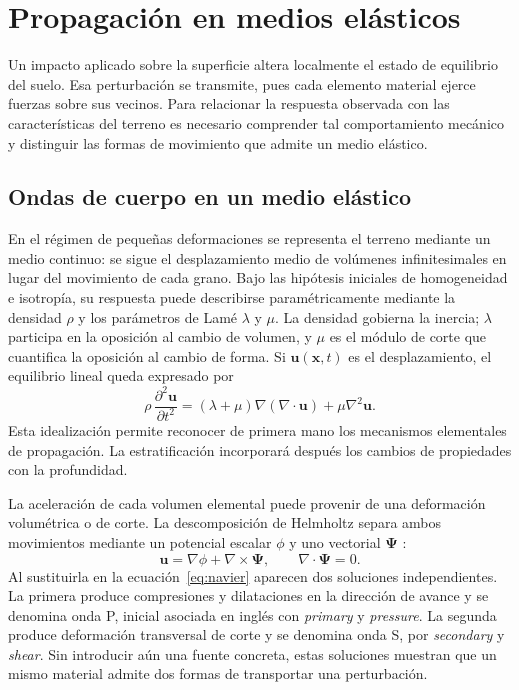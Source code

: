 \section{Propagación en medios elásticos}
\label{sec:fundamentos}

Un impacto aplicado sobre la superficie altera localmente el estado de equilibrio del suelo. Esa perturbación se transmite, pues cada elemento material ejerce fuerzas sobre sus vecinos. Para relacionar la respuesta observada con las características del terreno es necesario comprender tal comportamiento mecánico y distinguir las formas de movimiento que admite un medio elástico.

\subsection{Ondas de cuerpo en un medio elástico}
\label{sec:medio-elastico}

En el régimen de pequeñas deformaciones se representa el terreno mediante un medio continuo: se sigue el desplazamiento medio de volúmenes infinitesimales en lugar del movimiento de cada grano. Bajo las hipótesis iniciales de homogeneidad e isotropía, su respuesta puede describirse paramétricamente mediante la densidad $\rho$ y los parámetros de Lamé $\lambda$ y $\mu$. La densidad gobierna la inercia; $\lambda$ participa en la oposición al cambio de volumen, y $\mu$ es el módulo de corte que cuantifica la oposición al cambio de forma. Si $\mathbf{u}(\mathbf{x},t)$ es el desplazamiento, el equilibrio lineal queda expresado por \citep{Kramer1996,Foti2014}
\begin{equation}
\rho\,\frac{\partial^2\mathbf{u}}{\partial t^2}
=(\lambda+\mu)\nabla(\nabla\!\cdot\!\mathbf{u})+
\mu\nabla^2\mathbf{u}.
\label{eq:navier}
\end{equation}
Esta idealización permite reconocer de primera mano los mecanismos elementales de propagación. La estratificación incorporará después los cambios de propiedades con la profundidad.

La aceleración de cada volumen elemental puede provenir de una deformación volumétrica o de corte. La descomposición de Helmholtz separa ambos movimientos mediante un potencial escalar $\phi$ y uno vectorial $\mathbf{\Psi}$ \citep{Foti2014}:
\begin{equation}
\mathbf{u}=\nabla\phi+\nabla\times\mathbf{\Psi},
\qquad \nabla\cdot\mathbf{\Psi}=0.
\label{eq:helmholtz}
\end{equation}
Al sustituirla en la ecuación~\eqref{eq:navier} aparecen dos soluciones independientes. La primera produce compresiones y dilataciones en la dirección de avance y se denomina onda P, inicial asociada en inglés con \emph{primary} y \emph{pressure}. La segunda produce deformación transversal de corte y se denomina onda S, por \emph{secondary} y \emph{shear}. Sin introducir aún una fuente concreta, estas soluciones muestran que un mismo material admite dos formas de transportar una perturbación.

